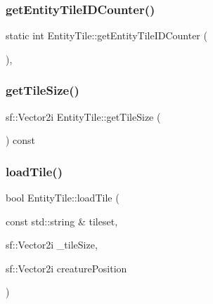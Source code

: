 \mbox{\label{class_entity_tile_acabd6691ddcf65a812c38e86e12e28e7}} 
\subsubsection{\texorpdfstring{get\+Entity\+Tile\+I\+D\+Counter()}{getEntityTileIDCounter()}}
{\footnotesize\ttfamily static int Entity\+Tile\+::get\+Entity\+Tile\+I\+D\+Counter (\begin{DoxyParamCaption}{ }\end{DoxyParamCaption})\hspace{0.3cm}{\ttfamily [inline]}, {\ttfamily [static]}}

\mbox{\label{class_entity_tile_a73cc06d0699f6d30a08d93e5cf9afe3b}} 
\subsubsection{\texorpdfstring{get\+Tile\+Size()}{getTileSize()}}
{\footnotesize\ttfamily sf\+::\+Vector2i Entity\+Tile\+::get\+Tile\+Size (\begin{DoxyParamCaption}{ }\end{DoxyParamCaption}) const}

\mbox{\label{class_entity_tile_a1a6b6b995ad942e7850f14cc6e693bbc}} 
\subsubsection{\texorpdfstring{load\+Tile()}{loadTile()}}
{\footnotesize\ttfamily bool Entity\+Tile\+::load\+Tile (\begin{DoxyParamCaption}\item[{const std\+::string \&}]{tileset,  }\item[{sf\+::\+Vector2i}]{\+\_\+tile\+Size,  }\item[{sf\+::\+Vector2i}]{creature\+Position }\end{DoxyParamCaption})}

